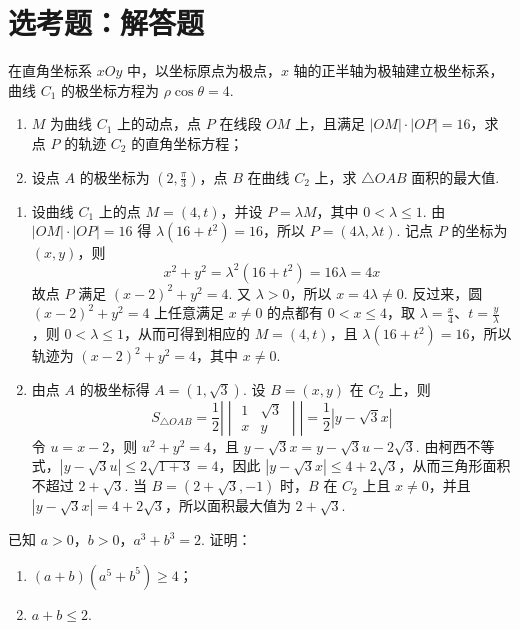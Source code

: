 \section{选考题：解答题}

\begin{problem}
在直角坐标系 \(xOy\) 中，以坐标原点为极点，\(x\) 轴的正半轴为极轴建立极坐标系，曲线 \(C_1\) 的极坐标方程为 \(\rho\cos\theta=4\).
\begin{enumerate}
\item \(M\) 为曲线 \(C_1\) 上的动点，点 \(P\) 在线段 \(OM\) 上，且满足 \(\lvert OM\rvert\cdot\lvert OP\rvert=16\)，求点 \(P\) 的轨迹 \(C_2\) 的直角坐标方程；
\item 设点 \(A\) 的极坐标为 \((2,\frac{\pi}{3})\)，点 \(B\) 在曲线 \(C_2\) 上，求 \(\triangle OAB\) 面积的最大值.
\end{enumerate}
\end{problem}

\begin{solution}
\begin{enumerate}
\item 设曲线 \(C_1\) 上的点 \(M=(4,t)\)，并设 \(P=\lambda M\)，其中 \(0<\lambda\le1\). 由 \(\lvert OM\rvert\cdot\lvert OP\rvert=16\) 得 \(\lambda(16+t^2)=16\)，所以 \(P=(4\lambda,\lambda t)\). 记点 \(P\) 的坐标为 \((x,y)\)，则
\[
x^2+y^2=\lambda^2(16+t^2)=16\lambda=4x
\]
故点 \(P\) 满足 \((x-2)^2+y^2=4\). 又 \(\lambda>0\)，所以 \(x=4\lambda\ne0\). 反过来，圆 \((x-2)^2+y^2=4\) 上任意满足 \(x\ne0\) 的点都有 \(0<x\le4\)，取 \(\lambda=\frac{x}{4}\)、\(t=\frac{y}{\lambda}\)，则 \(0<\lambda\le1\)，从而可得到相应的 \(M=(4,t)\)，且 \(\lambda(16+t^2)=16\)，所以轨迹为 \((x-2)^2+y^2=4\)，其中 \(x\ne0\).
\item 由点 \(A\) 的极坐标得 \(A=(1,\sqrt3)\). 设 \(B=(x,y)\) 在 \(C_2\) 上，则
\[
S_{\triangle OAB}=\frac12\left|\begin{vmatrix}1&\sqrt3\\x&y\end{vmatrix}\right|=\frac12\left|y-\sqrt3x\right|
\]
令 \(u=x-2\)，则 \(u^2+y^2=4\)，且 \(y-\sqrt3x=y-\sqrt3u-2\sqrt3\). 由柯西不等式，\(|y-\sqrt3u|\le2\sqrt{1+3}=4\)，因此 \(|y-\sqrt3x|\le4+2\sqrt3\)，从而三角形面积不超过 \(2+\sqrt3\). 当 \(B=(2+\sqrt3,-1)\) 时，\(B\) 在 \(C_2\) 上且 \(x\ne0\)，并且 \(|y-\sqrt3x|=4+2\sqrt3\)，所以面积最大值为 \(2+\sqrt3\).
\end{enumerate}
\end{solution}

\begin{problem}
已知 \(a>0\)，\(b>0\)，\(a^3+b^3=2\). 证明：
\begin{enumerate}
\item \((a+b)(a^5+b^5)\ge4\)；
\item \(a+b\le2\).
\end{enumerate}
\end{problem}

